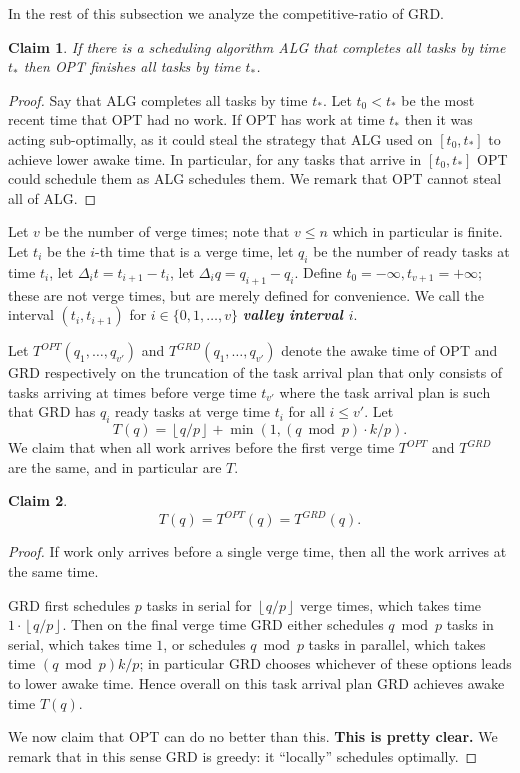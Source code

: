 \documentclass[twocolumn]{article}[10pt]
\newcommand{\defn}[1]{{\textit{\textbf{\boldmath #1}}}\xspace}
\newcommand{\floor}[1]{\left\lfloor #1 \right\rfloor}
\newtheorem{clm}{Claim}
\begin{document}
In the rest of this subsection we analyze the competitive-ratio
of GRD.

\begin{clm}
  \label{clm:OPT_finishes_before_you}
  If there is a scheduling algorithm ALG that completes all tasks by
  time $t_*$ then OPT finishes all tasks by time $t_*$.
\end{clm}
\begin{proof}
  Say that ALG completes all tasks by time $t_*$.
  Let $t_0 < t_*$ be the most recent time that OPT had no work.
  If OPT has work at time $t_*$ then it was acting sub-optimally,
  as it could steal the strategy that ALG used on $[t_0, t_*]$ to
  achieve lower awake time. In particular, for any tasks that
  arrive in $[t_0, t_*]$ OPT could schedule them as ALG schedules
  them. We remark that OPT cannot steal all of ALG. 
\end{proof}

Let $v$ be the number of verge times; note that $v\le n$ which
in particular is finite. Let $t_i$ be the $i$-th time that is a
verge time, let $q_i$ be the number of ready tasks at time
$t_i$, let $\Delta_i t = t_{i+1} - t_i$, let $\Delta_i q =
q_{i+1} - q_i$. Define $t_0 = -\infty, t_{v+1} = +\infty$; 
these are not verge times, but are merely defined for convenience.
We call the interval $(t_i, t_{i+1})$ for $i\in \{0,1,\ldots,
v\}$ \defn{valley interval $i$}. 

Let $T^{OPT}(q_1, \ldots, q_{v'})$ and $T^{GRD}(q_1, \ldots,
q_{v'})$ denote the awake time of OPT and GRD respectively on
the truncation of the task arrival plan that only consists of
tasks arriving at times before verge time $t_{v'}$ where the
task arrival plan is such that GRD has $q_i$ ready tasks at verge
time $t_i$ for all $i \le v'$. Let 
$$ T(q) = \floor{q/p} + \min(1, (q\bmod p)\cdot k/p). $$
We claim that when all work arrives before the first verge time
$T^{OPT}$ and $T^{GRD}$ are the same, and in particular are $T$.
\begin{clm}
  $$T(q) = T^{OPT}(q) = T^{GRD}(q).$$
\end{clm}
\begin{proof}
  If work only arrives before a single verge time, then all the
  work arrives at the same time. 

  GRD first schedules $p$ tasks in serial for $\floor{q/p}$
  verge times, which takes time $1\cdot \floor{q/p}$. Then on
  the final verge time GRD either schedules $q\bmod p$ tasks
  in serial, which takes time $1$, or schedules $q\bmod p$
  tasks in parallel, which takes time $(q\bmod p)k/p$; in
  particular GRD chooses whichever of these options leads to
  lower awake time. Hence overall on this task arrival plan
  GRD achieves awake time $T(q)$.

  We now claim that OPT can do no better than this. \textbf{This
  is pretty clear.} We remark that in this sense GRD is greedy: it
  \enquote{locally} schedules optimally. 

\end{proof}
\end{document}
